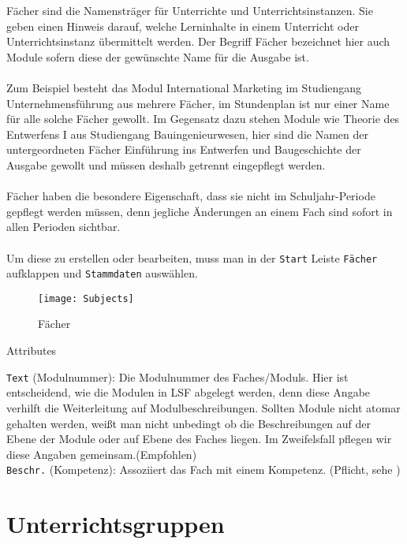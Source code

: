 Fächer sind die Namensträger für Unterrichte und Unterrichtsinstanzen. Sie geben einen Hinweis darauf, welche Lerninhalte in einem Unterricht oder Unterrichtsinstanz übermittelt werden. Der Begriff Fächer bezeichnet hier auch Module sofern diese der gewünschte Name für die Ausgabe ist.\\
\\
Zum Beispiel besteht das Modul International Marketing im Studiengang Unternehmensführung aus mehrere Fächer, im Stundenplan ist nur einer Name für alle solche Fächer gewollt. Im Gegensatz dazu stehen Module wie Theorie des Entwerfens I aus Studiengang Bauingenieurwesen, hier sind die Namen der untergeordneten Fächer Einführung ins Entwerfen und Baugeschichte der Ausgabe gewollt und müssen deshalb getrennt eingepflegt werden.\\
\\ 
Fächer haben die besondere Eigenschaft, dass sie nicht im Schuljahr-Periode gepflegt werden müssen, denn jegliche Änderungen an einem Fach sind sofort in allen Perioden sichtbar.\\
\\
Um diese zu erstellen oder bearbeiten, muss man in der \texttt{Start} Leiste \texttt{Fächer} aufklappen und \texttt{Stammdaten} auswählen.

\begin{figure}[h]
	\centering
	\texttt{[image: Subjects]}
	\vspace{-5pt}
	\caption{Fächer}
	\label{fig:subjects}
\end{figure}

\noindent
{\large Attributes\par}
\vspace{8pt}

\noindent
\texttt{Text} (Modulnummer): Die Modulnummer des Faches/Moduls. Hier ist entscheidend, wie die Modulen in LSF abgelegt werden, denn diese Angabe verhilft die Weiterleitung auf Modulbeschreibungen. Sollten Module nicht atomar gehalten werden, weißt man nicht unbedingt ob die Beschreibungen auf der Ebene der Module oder auf Ebene des Faches liegen. Im Zweifelsfall pflegen wir diese Angaben gemeinsam.(Empfohlen)\\

\noindent
\texttt{Beschr.} (Kompetenz): Assoziiert das Fach mit einem Kompetenz. (Pflicht, sehe )\\

\newpage

\section{Unterrichtsgruppen}

